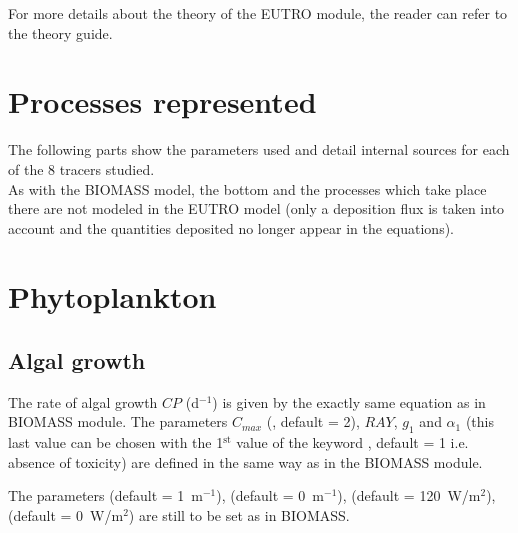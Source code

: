For more details about the theory of the EUTRO module,
the reader can refer to the \waqtel theory guide.


\section{Processes represented}


The following parts show the parameters used and detail internal sources for each of the 8 tracers studied.\\

As with the BIOMASS model, the bottom and the processes which take place there are not modeled in the EUTRO model
(only a deposition flux is taken into account and the quantities deposited no longer appear in the equations).\\


\section{Phytoplankton}

\subsection{Algal growth}

The rate of algal growth $CP$ (d$^{-1}$) is given by
the exactly same equation as in BIOMASS module.
The parameters $C_{max}$
(, default = 2),
$RAY$, $g_1$ and $\alpha_1$
(this last value can be chosen with the 1$^{\textrm{st}}$ value of the keyword
, default = 1 i.e. absence of toxicity)
are defined in the same way as in the BIOMASS module.

The parameters
 (default = 1~m$^{-1}$),
 (default = 0~m$^{-1}$),
 (default = 120~W/m$^2$),
 (default = 0~W/m$^2$)
are still to be set as in BIOMASS.\\

